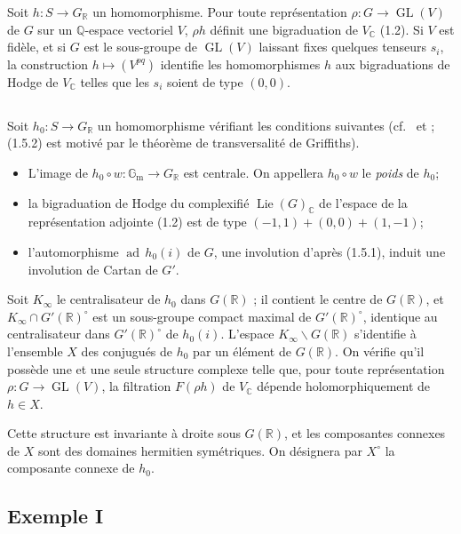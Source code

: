 \documentclass[11pt]{amsart}
\theoremstyle{plain}
\theoremstyle{definition}
\DeclareMathOperator{\Lie}{Lie}
\DeclareMathOperator{\GL}{GL}
\DeclareMathOperator{\ad}{ad}
\newcommand{\QQ}{\mathbb{Q}}
\newcommand{\RR}{\mathbb{R}}
\newcommand{\CC}{\mathbb{C}}
\begin{document}
Soit $h : S \to G_{\RR}$ un homomorphisme. Pour toute repr\'esentation $\rho : G \to \GL(V)$ de $G$ sur un $\QQ$-espace vectoriel $V$, $\rho h$ d\'efinit une bigraduation de $V_{\CC}$ (1.2). Si $V$ est fid\`ele, et si $G$ est le sous-groupe de $\GL(V)$ laissant fixes quelques tenseurs $s_i$, la construction $h \mapsto (V^{pq})$ identifie les homomorphismes $h$ aux bigraduations de Hodge de $V_{\CC}$ telles que les $s_i$ soient de type $(0,0)$.

\subsection{}

Soit $h_0 : S \to G_{\RR}$ un homomorphisme v\'erifiant les conditions suivantes (cf.\ \cite{Mu2} et \cite{DG} ; (1.5.2) est motiv\'e par le th\'eor\`eme de transversalit\'e de Griffiths).

\begin{itemize}
\item[(1.5.1)] L'image de $h_0 \circ w : \mathbb{G}_{\mathrm{m}} \to G_{\RR}$ est centrale. On appellera $h_0 \circ w$ le \emph{poids} de $h_0$;
\item[(1.5.2)] la bigraduation de Hodge du complexifi\'e $\Lie(G)_{\CC}$ de l'espace de la repr\'esentation adjointe (1.2) est de type $(-1,1) + (0,0) + (1,-1)$;
\item[(1.5.3)] l'automorphisme $\ad\, h_0(i)$ de $G$, une involution d'apr\`es (1.5.1), induit une involution de Cartan de $G'$.
\end{itemize}

Soit $K_\infty$ le centralisateur de $h_0$ dans $G(\RR)$ ; il contient le centre de $G(\RR)$, et $K_\infty \cap G'(\RR)^\circ$ est un sous-groupe compact maximal de $G'(\RR)^\circ$, identique au centralisateur dans $G'(\RR)^\circ$ de $h_0(i)$. L'espace $K_\infty \backslash G(\RR)$ s'identifie \`a l'ensemble $X$ des conjugu\'es de $h_0$ par un \'el\'ement de $G(\RR)$. On v\'erifie qu'il poss\`ede une et une seule structure complexe telle que, pour toute repr\'esentation $\rho : G \to \GL(V)$, la filtration $F(\rho h)$ de $V_{\CC}$ d\'epende holomorphiquement de $h \in X$.

Cette structure est invariante \`a droite sous $G(\RR)$, et les composantes connexes de $X$ sont des domaines hermitien sym\'etriques. On d\'esignera par $X^\circ$ la composante connexe de $h_0$.

\subsection{Exemple I}
\end{document}
